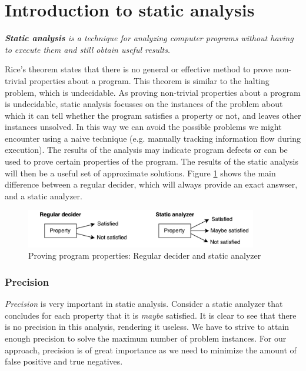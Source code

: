 \section{Introduction to static analysis}
\label{sec:staticAnalysis}

\begin{definition}
\textit{\textbf{Static analysis} is a technique for analyzing computer programs without having to execute them and still obtain useful results.}
\end{definition}

Rice's theorem states that there is no general or effective method to prove non-trivial properties about a program. This theorem is similar to the halting problem, which is undecidable. As proving non-trivial properties about a program is undecidable, static analysis focusses on the instances of the problem about which it can tell whether the program satisfies a property or not, and leaves other instances unsolved. In this way we can avoid the possible problems we might encounter using a naive technique (e.g. manually tracking information flow during execution). The results of the analysis may indicate program defects or can be used to prove certain properties of the program.  The results of the static analysis will then be a useful set of approximate solutions. Figure \ref{fig:decider} shows the main difference between a regular decider, which will always provide an exact answser, and a static analyzer.

\begin{figure}[!h]
    \centering
      \includegraphics[width=0.9\textwidth]{images/decider} 
      \caption{Proving program properties: Regular decider and static analyzer}
    \label{fig:decider}
\end{figure}

\subsubsection*{Precision}

\textit{Precision} is very important in static analysis. Consider a static analyzer that concludes for each property that it is \textit{maybe} satisfied. It is clear to see that there is no precision in this analysis, rendering it useless. We have to strive to attain enough precision to solve the maximum number of problem instances. For our approach, precision is of great importance as we need to minimize the amount of false positive and true negatives.


